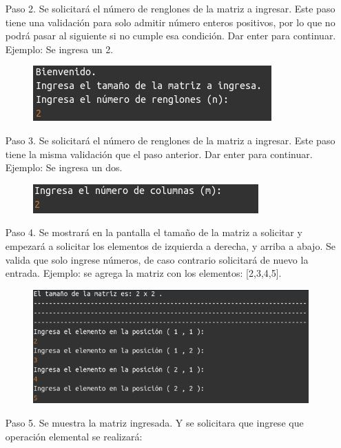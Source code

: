 \documentclass[11pt,letterpaper]{article}
\begin{document}
\begin{enumerate}
\begin{itemize}
\item[Paso 2.] Se solicitará el número de renglones de la matriz a ingresar. Este paso tiene una validación para solo admitir número enteros positivos, por lo que no podrá pasar al siguiente si no cumple esa condición. Dar enter para continuar. Ejemplo: Se ingresa un 2.
\begin{figure}[H]
\centering
\includegraphics[scale=.7]{paso_2.png}
\end{figure}
\item[Paso 3.] Se solicitará el número de renglones de la matriz a ingresar. Este paso tiene la misma validación que el paso anterior. Dar enter para continuar. Ejemplo: Se ingresa un dos.
\begin{figure}[H]
\centering
\includegraphics[scale=.7]{paso_3.png}
\end{figure}
\item[Paso 4.] Se mostrará en la pantalla el tamaño de la matriz a solicitar y empezará a solicitar los elementos de izquierda a derecha, y arriba a abajo. Se valida que solo ingrese números, de caso contrario solicitará de nuevo la entrada. Ejemplo: se agrega la matriz con los elementos: [2,3,4,5].
\begin{figure}[H]
\centering
\includegraphics[scale=.7]{paso_4.png}
\end{figure}
\item[Paso 5.] Se muestra la matriz ingresada. Y se solicitara que ingrese que operación elemental se realizará:


\end{itemize}
\end{enumerate}
\end{document}

